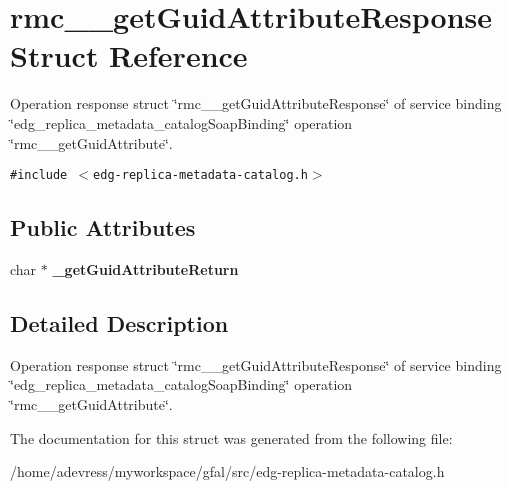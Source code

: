 \section{rmc\_\-\_\-get\-Guid\-Attribute\-Response Struct Reference}
\label{structrmc____getGuidAttributeResponse}
Operation response struct \char`\"{}rmc\_\-\_\-get\-Guid\-Attribute\-Response\char`\"{} of service binding \char`\"{}edg\_\-replica\_\-metadata\_\-catalog\-Soap\-Binding\char`\"{} operation \char`\"{}rmc\_\-\_\-get\-Guid\-Attribute\char`\"{}.  


{\tt \#include $<$edg-replica-metadata-catalog.h$>$}

\subsection*{Public Attributes}
\begin{CompactItemize}
\item 
char $\ast$ \textbf{\_\-get\-Guid\-Attribute\-Return}\label{structrmc____getGuidAttributeResponse_f40d690f5c6f2665e4999ca8f11f9ab5}

\end{CompactItemize}


\subsection{Detailed Description}
Operation response struct \char`\"{}rmc\_\-\_\-get\-Guid\-Attribute\-Response\char`\"{} of service binding \char`\"{}edg\_\-replica\_\-metadata\_\-catalog\-Soap\-Binding\char`\"{} operation \char`\"{}rmc\_\-\_\-get\-Guid\-Attribute\char`\"{}. 



The documentation for this struct was generated from the following file:\begin{CompactItemize}
\item 
/home/adevress/myworkspace/gfal/src/edg-replica-metadata-catalog.h\end{CompactItemize}

